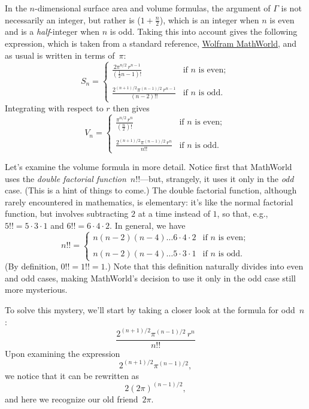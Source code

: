 In the $n$-dimensional surface area and volume formulas, the argument of $\Gamma$ is not necessarily an integer, but rather is ($1 + \frac{n}{2}$), which is an integer when $n$ is even and is a \emph{half}-integer when $n$ is odd. Taking this into account gives the following expression, which is taken from a standard reference, \href{http://mathworld.wolfram.com/Hypersphere.html}{Wolfram MathWorld}, and as usual is written in terms of~$\pi$:
\[ S_n = \begin{cases}
\displaystyle \frac{2\pi^{n/2}\,r^{n-1}}{(\frac{1}{2}n - 1)!} & \text{if } n \text{ is even}; \\ \\
 \displaystyle \frac{2^{(n+1)/2}\pi^{(n-1)/2}\,r^{n-1}}{(n-2)!!} & \text{if } n \text{ is odd}.
 \end{cases} \]
Integrating with respect to $r$ then gives
\[ V_n = \begin{cases}
\displaystyle \frac{\pi^{n/2}\,r^n}{(\frac{n}{2})!} & \text{if } n \text{ is even}; \\ \\
 \displaystyle \frac{2^{(n+1)/2}\pi^{(n-1)/2}\,r^n}{n!!} & \text{if } n \text{ is odd}.
 \end{cases} \]

Let's examine the volume formula in more detail. Notice first that MathWorld uses the \emph{double factorial function}~$n!!$---but, strangely, it uses it only in the \emph{odd} case. (This is a hint of things to come.) The double factorial function, although rarely encountered in mathematics, is elementary: it's like the normal factorial function, but involves subtracting $2$ at a time instead of $1$, so that, e.g., $5!! = 5 \cdot 3 \cdot 1$ and $6!! = 6 \cdot 4 \cdot 2$. In general, we have
\[ n!! = \begin{cases}
 n(n-2)(n-4)\ldots6\cdot4\cdot2 & \text{if } n \text{ is even}; \\ \\
 n(n-2)(n-4)\ldots5\cdot3\cdot1 & \text{if } n \text{ is odd}.
 \end{cases} \]
 (By definition, $0!! = 1!! = 1$.) Note that this definition naturally divides into even and odd cases, making MathWorld's decision to use it only in the odd case still more mysterious.

To solve this mystery, we'll start by taking a closer look at the formula for odd~$n$:
\[ \frac{2^{(n+1)/2}\pi^{(n-1)/2}\,r^n}{n!!} \]
Upon examining the expression
\[ 2^{(n+1)/2}\pi^{(n-1)/2}, \]
we notice that it can be rewritten as
\[ 2(2\pi)^{(n-1)/2}, \]
and here we recognize our old friend~$2\pi$.

